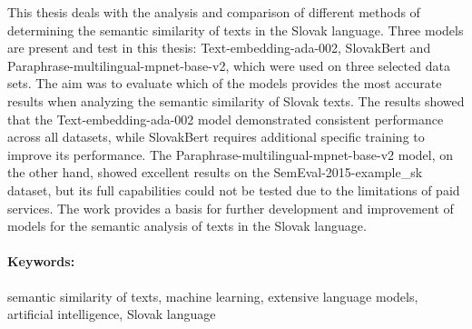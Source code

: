 \documentclass[12pt, twoside]{book}
\begin{document}
This thesis deals with the analysis and comparison of different methods of determining the semantic similarity of texts in the Slovak language. Three models are present and test in this thesis: Text-embedding-ada-002, SlovakBert and Paraphrase-multilingual-mpnet-base-v2, which were used on three selected data sets. The aim was to evaluate which of the models provides the most accurate results when analyzing the semantic similarity of Slovak texts. The results showed that the Text-embedding-ada-002 model demonstrated consistent performance across all datasets, while SlovakBert requires additional specific training to improve its performance. The Paraphrase-multilingual-mpnet-base-v2 model, on the other hand, showed excellent results on the SemEval-2015-example\_sk dataset, but its full capabilities could not be tested due to the limitations of paid services. The work provides a basis for further development and improvement of models for the semantic analysis of texts in the Slovak language.


\paragraph*{Keywords:} semantic similarity of texts, machine learning, extensive language models, artificial intelligence, Slovak language


%
%
%




\tableofcontents



\end{document}
